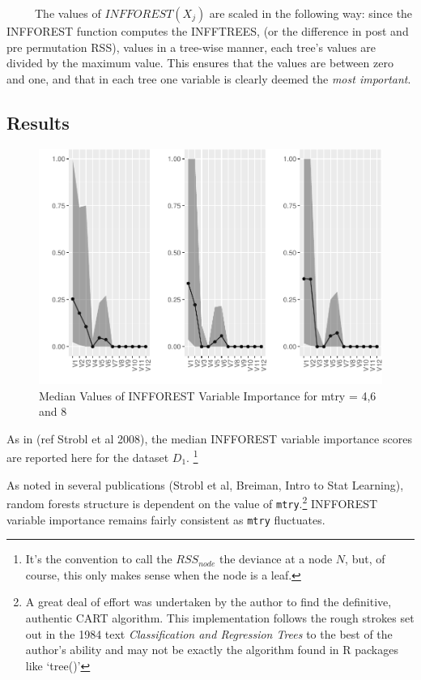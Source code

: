 \documentclass[12pt,twoside]{reedthesis}
\begin{document}
  ~~~~~The values of \(INFFOREST(X_j)\) are scaled in the following way:
  since the INFFOREST function computes the INFFTREES, (or the difference
  in post and pre permutation RSS), values in a tree-wise manner, each
  tree's values are divided by the maximum value. This ensures that the
  values are between zero and one, and that in each tree one variable is
  clearly deemed the \emph{most important}.
  
  \subsection{Results}\label{results}
  
  \begin{figure}[htbp]
  \centering
  \includegraphics{Thesis_files/figure-latex/figmtry-1.pdf}
  \caption{\label{fig:figmtry}Median Values of INFFOREST Variable Importance
  for mtry = 4,6 and 8}
  \end{figure}
  
  As in (ref Strobl et al 2008), the median INFFOREST variable importance
  scores are reported here for the dataset \(D_1\). \footnote{It's the
    convention to call the \(RSS_{node}\) the deviance at a node \(N\),
    but, of course, this only makes sense when the node is a leaf.}
  
  As noted in several publications (Strobl et al, Breiman, Intro to Stat
  Learning), random forests structure is dependent on the value of
  \texttt{mtry}.\footnote{A great deal of effort was undertaken by the
    author to find the definitive, authentic CART algorithm. This
    implementation follows the rough strokes set out in the 1984 text
    \emph{Classification and Regression Trees} to the best of the author's
    ability and may not be exactly the algorithm found in R packages like
    `tree()'} INFFOREST variable importance remains fairly consistent as
  \texttt{mtry} fluctuates.
  
\end{document}
